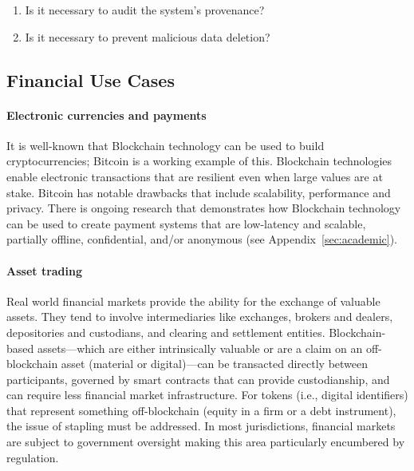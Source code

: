 \begin{enumerate}[start=3]
	\item Is it necessary to audit the system's provenance?
	\item Is it necessary to prevent malicious data deletion?
\end{enumerate}




\subsection{Financial Use Cases}

\paragraph{Electronic currencies and payments}


It is well-known that Blockchain technology can be used to build cryptocurrencies; Bitcoin is a working example of this.
Blockchain technologies enable electronic transactions that are resilient even when large values are at stake.
Bitcoin has notable drawbacks that include scalability, performance and privacy.
There is ongoing research that demonstrates how Blockchain technology can be used to create payment systems that are low-latency and scalable, partially offline, confidential, and/or anonymous (see Appendix~\ref{sec:academic}).

\paragraph{Asset trading}

Real world financial markets provide the ability for the exchange of valuable assets. 
They tend to involve intermediaries like exchanges, brokers and dealers, depositories and custodians, and clearing and settlement entities. 
Blockchain-based assets---which are either intrinsically valuable or are a claim on an off-blockchain asset (material or digital)---can be transacted directly between participants, governed by smart contracts that can provide custodianship, and can require less financial market infrastructure.
For tokens (i.e., digital identifiers) that represent something off-blockchain (\ie equity in a firm or a debt instrument), the issue of stapling must be addressed.
In most jurisdictions, financial markets are subject to government oversight making this area particularly encumbered by regulation.

